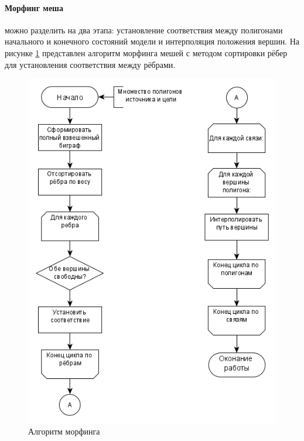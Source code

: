 \paragraph{Морфинг меша} можно разделить на два этапа: установление соответствия между полигонами начального и конечного состояний модели и интерполяция положения вершин. На рисунке \ref{fig:morphingalg} представлен алгоритм морфинга мешей с методом сортировки рёбер для установления соответствия между рёбрами.
\begin{figure}
	\centering
	\includegraphics[width=0.7\linewidth]{morph}
	\caption[Алгоритм морфинга]{Алгоритм морфинга}
	\label{fig:morphingalg}
\end{figure}
